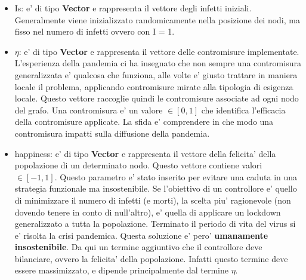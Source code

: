 \begin{itemize}
	\item Is: e' di tipo \textbf{Vector} e rappresenta il vettore degli infetti iniziali.
	Generalmente viene inizializzato randomicamente nella posizione dei nodi, ma fisso nel numero
	di infetti ovvero con I = 1. 
	\item $\eta$: e' di tipo \textbf{Vector} e rappresenta il vettore delle contromisure implementate.
	L'esperienza della pandemia ci ha insegnato che non sempre una contromisura generalizzata e' qualcosa
	che funziona, alle volte e' giusto trattare in maniera locale il problema, applicando contromisure mirate
	alla tipologia di esigenza locale. Questo vettore raccoglie quindi le contromisure associate ad ogni 
	nodo del grafo. Una contromisura e' un valore $\in [0,1]$ che identifica l'efficacia della contromisure applicate.
	La sfida e' comprendere in che modo una contromisura impatti sulla diffusione della pandemia.
	\item happiness: e' di tipo \textbf{Vector} e rappresenta il vettore della felicita' della popolazione 
	di un determinato nodo. Questo vettore contiene valori $\in [-1,1]$. Questo parametro e' stato inserito 
	per evitare una caduta in una strategia funzionale ma insostenibile. Se l'obiettivo di un controllore 
	e' quello di minimizzare il numero di infetti (e morti), la scelta piu' ragionevole (non dovendo tenere 
	in conto di null'altro), e' quella di applicare un lockdown generalizzato a tutta la popolazione. 
	Terminato il periodo di vita del virus si e' risolta la crisi pandemica. Questa soluzione e' pero'
	\textbf{umanamente insostenibile}. Da qui un termine aggiuntivo che il controllore deve bilanciare, 
	ovvero la felicita' della popolazione. Infatti questo termine deve essere massimizzato, e dipende 
	principalmente dal termine $\eta$.
\end{itemize}

